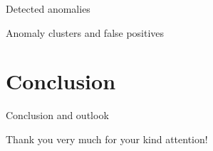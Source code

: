 \documentclass[aspectratio=169]{beamer}
\begin{document}
\begin{frame}{Detected anomalies}

\end{frame}

\begin{frame}{Anomaly clusters and false positives}

\end{frame}

\section{Conclusion}
\begin{frame}{Conclusion and outlook}

\end{frame}

\begin{frame}
    \thispagestyle{empty}
    \centering \Large
    Thank you very much for your kind attention!
\end{frame}
\end{document}
